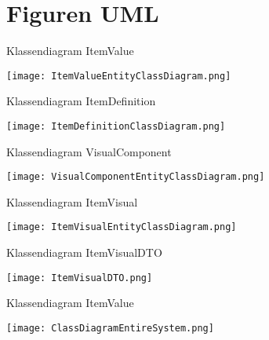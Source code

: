 \chapter{Figuren UML}
\label{appendix:FiguresUML}

\begin{graphic}
    \captionsetup{type=figure}
    \caption{Klassendiagram ItemValue}
    \texttt{[image: ItemValueEntityClassDiagram.png]}
    \label{appendix:ItemValueEntityClassDiagram}
\end{graphic}

\begin{graphic}
    \captionsetup{type=figure}
    \caption{Klassendiagram  ItemDefinition}
    \texttt{[image: ItemDefinitionClassDiagram.png]}
    \label{appendix:ItemDefinitionClassDiagram}
\end{graphic}

\whitespace[2]
\begin{graphic}
    \captionsetup{type=figure}
    \caption{Klassendiagram VisualComponent}
    \texttt{[image: VisualComponentEntityClassDiagram.png]}
    \label{appendix:VisualComponentEntityClassDiagram}
\end{graphic}

\whitespace[2]
\begin{graphic}
	\captionsetup{type=figure}
	\caption{Klassendiagram ItemVisual}
	\texttt{[image: ItemVisualEntityClassDiagram.png]}
	\label{appendix:ItemVisualEntityClassDiagram}
\end{graphic}

\whitespace[2]
\begin{graphic}
	\captionsetup{type=figure}
	\caption{Klassendiagram ItemVisualDTO}
	\texttt{[image: ItemVisualDTO.png]}
	\label{appendix:ItemVisualDTOClassDiagram}
\end{graphic}

\begin{graphic}
    \captionsetup{type=figure}
    \caption{Klassendiagram ItemValue}
    \texttt{[image: ClassDiagramEntireSystem.png]}
    \label{appendix:ClassDiagramEntireSystem}
\end{graphic}
